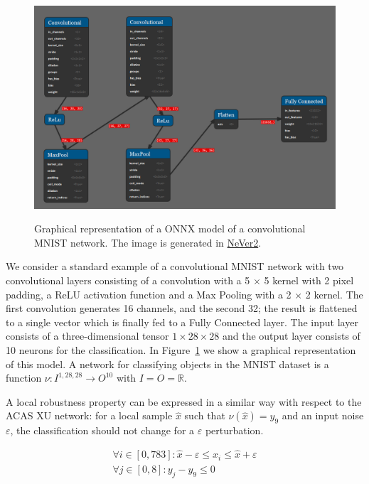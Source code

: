 \begin{figure}[t]
	\includegraphics[width=1\textwidth]{imgs/MNIST_conv_CCNN.png}
	\label{img:mnist-architecture}
	\caption{Graphical representation of a ONNX model of a convolutional
		MNIST network. The image is generated in 
		\href{https://github.com/NeVerTools/NeVer2}{NeVer2}.}
\end{figure}

We consider a standard example of a convolutional MNIST network with 
two convolutional layers consisting of a convolution with a 5 $\times$ 5
kernel with 2 pixel padding, a ReLU activation function and a Max Pooling
with a 2 $\times$ 2 kernel. The first convolution generates 16 channels,
and the second 32; the result is flattened to a single vector which is
finally fed to a Fully Connected layer. The input layer consists of a 
three-dimensional tensor $1 \times 28 \times 28$ and the output layer 
consists of 10 neurons for the classification. 
In Figure~\ref{img:mnist-architecture} we show a graphical
representation of this model. A network for classifying objects in the MNIST
dataset is a function $\nu : I^{1,28,28} \to O^{10}$ with $I = O = \mathbb{R}$.

A local robustness property can be expressed in a similar way with respect
to the ACAS XU network: for a local sample $\hat{x}$ such that 
$\nu(\hat{x}) = y_9$ and an input noise $\varepsilon$, the classification 
should not change for a $\varepsilon$ perturbation.

\begin{equation}
	\label{eq:mnist-property1}
	\begin{array}{l}
		\forall i \in [0, 783] : 
			\hat{x} - \varepsilon \leq x_i \leq \hat{x} + \varepsilon \\	
		\forall j \in [0, 8] : y_j - y_9 \leq 0
	\end{array}
\end{equation}

